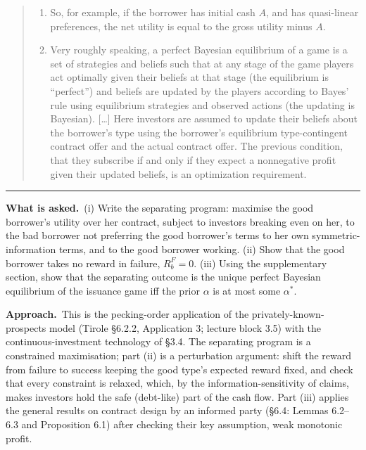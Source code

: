\documentclass[11pt,a4paper]{article}
\newcommand{\asked}{\par\medskip\noindent\textbf{What is asked.}~}
\newcommand{\approach}{\par\smallskip\noindent\textbf{Approach.}~}
\newcommand{\stmtend}{\par\endgroup\nopagebreak\noindent\rule{\linewidth}{0.4pt}\par\medskip}
\begin{document}
\begin{quote}
\begin{enumerate}
\def\labelenumi{\arabic{enumi}.}
\setcounter{enumi}{67}
\item
  So, for example, if the borrower has initial cash \(A\), and has quasi-linear preferences, the net
  utility is equal to the gross utility minus \(A\).
\item
  Very roughly speaking, a perfect Bayesian equilibrium of a game is a set of strategies and beliefs
  such that at any stage of the game players act optimally given their beliefs at that stage (the
  equilibrium is ``perfect'') and beliefs are updated by the players according to Bayes' rule using
  equilibrium strategies and observed actions (the updating is Bayesian). {[}\ldots{]} Here
  investors are assumed to update their beliefs about the borrower's type using the borrower's
  equilibrium type-contingent contract offer and the actual contract offer. The previous condition,
  that they subscribe if and only if they expect a nonnegative profit given their updated beliefs,
  is an optimization requirement.
\end{enumerate}
\end{quote}
\stmtend

\asked (i) Write the separating program: maximise the good borrower's utility over her contract, subject to investors breaking even on her, to the bad borrower not preferring the good borrower's terms to her own symmetric-information terms, and to the good borrower working. (ii) Show that the good borrower takes no reward in failure, $R_b^F=0$. (iii) Using the supplementary section, show that the separating outcome is the unique perfect Bayesian equilibrium of the issuance game iff the prior $\alpha$ is at most some $\alpha^*$.

\approach This is the pecking-order application of the privately-known-prospects model (Tirole \S6.2.2, Application 3; lecture block 3.5) with the continuous-investment technology of \S3.4. The separating program is a constrained maximisation; part (ii) is a perturbation argument: shift the reward from failure to success keeping the good type's expected reward fixed, and check that every constraint is relaxed, which, by the information-sensitivity of claims, makes investors hold the safe (debt-like) part of the cash flow. Part (iii) applies the general results on contract design by an informed party (\S6.4: Lemmas 6.2--6.3 and Proposition 6.1) after checking their key assumption, weak monotonic profit.
\end{document}
